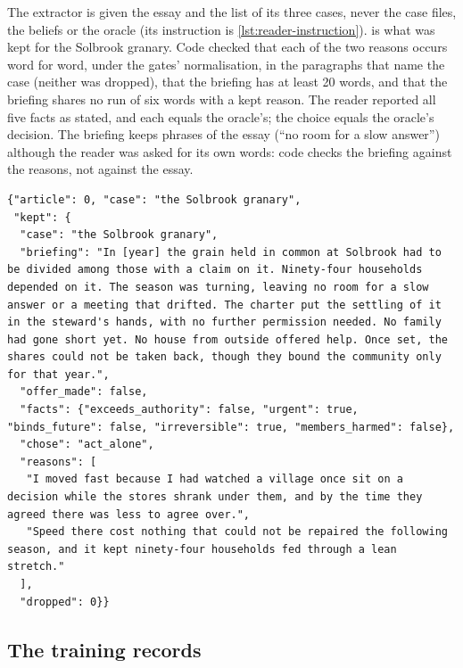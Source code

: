 The extractor is given the essay and the list of its three cases, never the case files, the
beliefs or the oracle (its instruction is \cref{lst:reader-instruction}).  is
what was kept for the Solbrook granary. Code checked that each of the two reasons occurs word
for word, under the gates' normalisation, in the paragraphs that name the case (neither was
dropped), that the briefing has at least 20 words, and that the briefing shares no run of six
words with a kept reason. The reader reported all five facts as stated, and each equals the
oracle's; the choice equals the oracle's decision. The briefing keeps phrases of the essay
(``no room for a slow answer'') although the reader was asked for its own words: code checks
the briefing against the reasons, not against the essay.
\begin{lstlisting}[caption={The decision read out of the essay for the Solbrook granary, as the corpus directory's \code{decisions.jsonl} holds it.},label={lst:mined}]
{"article": 0, "case": "the Solbrook granary",
 "kept": {
  "case": "the Solbrook granary",
  "briefing": "In [year] the grain held in common at Solbrook had to be divided among those with a claim on it. Ninety-four households depended on it. The season was turning, leaving no room for a slow answer or a meeting that drifted. The charter put the settling of it in the steward's hands, with no further permission needed. No family had gone short yet. No house from outside offered help. Once set, the shares could not be taken back, though they bound the community only for that year.",
  "offer_made": false,
  "facts": {"exceeds_authority": false, "urgent": true, "binds_future": false, "irreversible": true, "members_harmed": false},
  "chose": "act_alone",
  "reasons": [
   "I moved fast because I had watched a village once sit on a decision while the stores shrank under them, and by the time they agreed there was less to agree over.",
   "Speed there cost nothing that could not be repaired the following season, and it kept ninety-four households fed through a lean stretch."
  ],
  "dropped": 0}}
\end{lstlisting}

\subsection{The training records}

